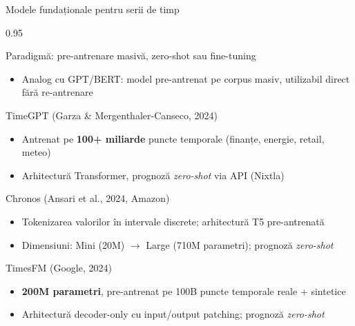 \documentclass[9pt, aspectratio=169, t]{beamer}
\begin{document}
\begin{frame}{Modele fundaționale pentru serii de timp}
    \vspace{-3mm}
    \begin{cminipage}{0.95\textwidth}
        {\scriptsize
        \begin{block}{Paradigmă: pre-antrenare masivă, zero-shot sau fine-tuning}
            \begin{itemize}\setlength{\itemsep}{0pt}
                \item Analog cu GPT/BERT: model pre-antrenat pe corpus masiv, utilizabil direct fără re-antrenare
            \end{itemize}
        \end{block}
        \vspace{-2mm}
        \begin{block}{TimeGPT (Garza \& Mergenthaler-Canseco, 2024)}
            \begin{itemize}\setlength{\itemsep}{0pt}
                \item Antrenat pe \textbf{100+ miliarde} puncte temporale (finanțe, energie, retail, meteo)
                \item Arhitectură Transformer, prognoză \emph{zero-shot} via API (Nixtla)
            \end{itemize}
        \end{block}
        \vspace{-2mm}
        \begin{block}{Chronos (Ansari et al., 2024, Amazon)}
            \begin{itemize}\setlength{\itemsep}{0pt}
                \item Tokenizarea valorilor în intervale discrete; arhitectură T5 pre-antrenată
                \item Dimensiuni: Mini (20M) $\to$ Large (710M parametri); prognoză \emph{zero-shot}
            \end{itemize}
        \end{block}
        \vspace{-2mm}
        \begin{block}{TimesFM (Google, 2024)}
            \begin{itemize}\setlength{\itemsep}{0pt}
                \item \textbf{200M parametri}, pre-antrenat pe 100B puncte temporale reale + sintetice
                \item Arhitectură decoder-only cu input/output patching; prognoză \emph{zero-shot}
            \end{itemize}
        \end{block}
        }
    \end{cminipage}
\end{frame}
\end{document}
